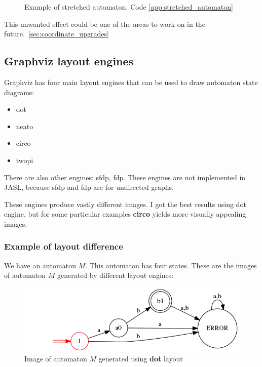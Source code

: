 \documentclass{ctuthesis}
\begin{document}
\begin{figure}[H]
\caption{Example of stretched automaton. Code \ref{app:stretched_automaton}}
\label{fig:stretched_automaton}
\end{figure}

This unwanted effect could be one of the areas to work on in the future.~\ref{sec:coordinate_upgrades}

\subsection{Graphviz layout engines}
Graphviz has four main layout engines that can be used to draw automaton state diagrams:
\begin{itemize}
	\item dot
	\item neato
	\item circo
	\item twopi
\end{itemize}

There are also other engines: sfdp, fdp. These engines are not implemented in JASL, because sfdp and fdp are for undirected graphs.

These engines produce vastly different images. I got the best results using dot engine, but for some particular examples \textbf{circo} yields more visually appealing images.
 
\subsubsection{Example of layout difference}
We have an automaton $M$. This automaton has four states. These are the images of automaton $M$ generated by different layout engines:

\begin{figure}[H]
\includegraphics[width=0.8\linewidth]{figures/layouts_dot.png}
\caption{Image of automaton $M$ generated using \textbf{dot} layout}
\label{fig:layout_diff_dot}
\end{figure}
\end{document}
